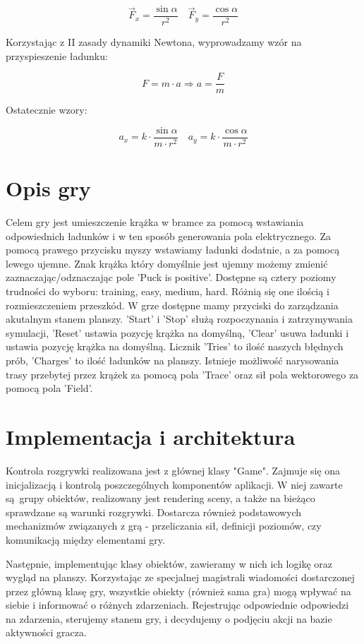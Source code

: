 \documentclass{article}
\begin{document}
$$
\vec{F}_{x}=\frac{\sin \alpha}{r^{2}} \quad \vec{F}_{y}=\frac{\cos \alpha}{r^{2}}
$$

\noindent Korzystając z II zasady dynamiki Newtona, wyprowadzamy wzór na przyspieszenie ładunku:

$$
F=m \cdot a \Rightarrow a=\frac{F}{m}
$$

\noindent Ostatecznie wzory:

$$
a_{x}=k \cdot \frac{\sin \alpha}{m \cdot r^{2}} \quad a_{y}=k \cdot \frac{\cos \alpha}{m \cdot r^{2}}
$$

\section{Opis gry}
Celem gry jest umieszczenie krążka w bramce za pomocą wstawiania odpowiednich ładunków i w ten sposób generowania pola elektrycznego. Za pomocą prawego przycisku myszy wstawiamy ładunki dodatnie, a za pomocą lewego ujemne. Znak krążka który domyślnie jest ujemny możemy zmienić zaznaczając/odznaczając pole 'Puck is positive'. Dostępne są cztery poziomy trudności do wyboru: training, easy, medium, hard. Różnią się one ilością i rozmieszczeniem przeszkód.
W grze dostępne mamy przyciski do zarządzania akutalnym stanem planszy. 'Start' i 'Stop' służą rozpoczynania i zatrzymywania symulacji, 'Reset' ustawia pozycję krążka na domyślną, 'Clear' usuwa ładunki i ustawia pozycję krążka na domyślną. Licznik 'Tries' to ilość naszych błędnych prób, 'Charges' to ilość ładunków na planszy. Istnieje możliwość narysowania trasy przebytej przez krążek za pomocą pola 'Trace' oraz sił pola wektorowego za pomocą pola 'Field'. 

\section{Implementacja i architektura}
Kontrola rozgrywki realizowana jest z głównej klasy "Game". Zajmuje się ona inicjalizacją i kontrolą poszczególnych komponentów aplikacji. W niej zawarte są grupy obiektów, realizowany jest rendering sceny, a także na bieżąco sprawdzane są warunki rozgrywki. Dostarcza również podstawowych mechanizmów związanych z grą - przeliczania sił, definicji poziomów, czy komunikacją między elementami gry.

Następnie, implementując klasy obiektów, zawieramy w nich ich logikę oraz wygląd na planszy. Korzystając ze specjalnej magistrali wiadomości dostarczonej przez główną klasę gry, wszystkie obiekty (również sama gra) mogą wpływać na siebie i informować o różnych zdarzeniach. Rejestrując odpowiednie odpowiedzi na zdarzenia, sterujemy stanem gry, i decydujemy o podjęciu akcji na bazie aktywności gracza.
\end{document}
